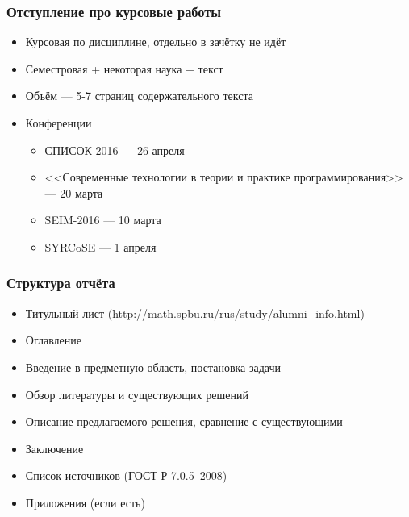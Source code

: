 \documentclass[xetex,mathserif,serif]{beamer}
\begin{document}
	\begin{frame}
		\frametitle{Отступление про курсовые работы}
		\begin{itemize}
			\item Курсовая по дисциплине, отдельно в зачётку не идёт
			\item Семестровая + некоторая наука + текст
			\item Объём --- 5-7 страниц содержательного текста
			\item Конференции
			\begin{itemize}
				\item СПИСОК-2016 --- 26 апреля
				\item {}<<Современные технологии в теории и практике программирования>> --- 20 марта
				\item SEIM-2016 --- 10 марта
				\item SYRCoSE --- 1 апреля
			\end{itemize}
		\end{itemize}					
	\end{frame}
	
	\begin{frame}
		\frametitle{Структура отчёта}
		\begin{itemize}
			\item Титульный лист (http://math.spbu.ru/rus/study/alumni\_info.html)
			\item Оглавление
			\item Введение в предметную область, постановка задачи
			\item Обзор литературы и существующих решений
			\item Описание предлагаемого решения, сравнение с существующими
			\item Заключение
			\item Список источников (ГОСТ Р 7.0.5--2008)
			\item Приложения (если есть)
		\end{itemize}					
	\end{frame}
	
\end{document}
